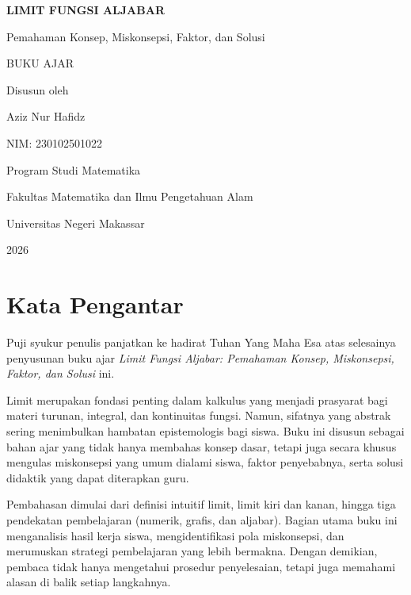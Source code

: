 \documentclass[12pt,a4paper,openany]{book}
\theoremstyle{definition}
\begin{document}
\begin{titlepage}
\centering
\vspace*{3cm}
{\Huge\bfseries LIMIT FUNGSI ALJABAR\par}
\vspace{0.5cm}
{\Large Pemahaman Konsep, Miskonsepsi, Faktor, dan Solusi\par}
\vspace{2cm}
{\Large BUKU AJAR\par}
\vspace{3cm}
{\large Disusun oleh\par}
\vspace{0.3cm}
{\large Aziz Nur Hafidz\par}
{\large NIM: 230102501022\par}
\vfill
{\large Program Studi Matematika\par}
{\large Fakultas Matematika dan Ilmu Pengetahuan Alam\par}
{\large Universitas Negeri Makassar\par}
{\large 2026\par}
\end{titlepage}

\frontmatter
\chapter*{Kata Pengantar}

Puji syukur penulis panjatkan ke hadirat Tuhan Yang Maha Esa atas selesainya penyusunan buku ajar \textit{Limit Fungsi Aljabar: Pemahaman Konsep, Miskonsepsi, Faktor, dan Solusi} ini.

Limit merupakan fondasi penting dalam kalkulus yang menjadi prasyarat bagi materi turunan, integral, dan kontinuitas fungsi. Namun, sifatnya yang abstrak sering menimbulkan hambatan epistemologis bagi siswa. Buku ini disusun sebagai bahan ajar yang tidak hanya membahas konsep dasar, tetapi juga secara khusus mengulas miskonsepsi yang umum dialami siswa, faktor penyebabnya, serta solusi didaktik yang dapat diterapkan guru.

Pembahasan dimulai dari definisi intuitif limit, limit kiri dan kanan, hingga tiga pendekatan pembelajaran (numerik, grafis, dan aljabar). Bagian utama buku ini menganalisis hasil kerja siswa, mengidentifikasi pola miskonsepsi, dan merumuskan strategi pembelajaran yang lebih bermakna. Dengan demikian, pembaca tidak hanya mengetahui prosedur penyelesaian, tetapi juga memahami alasan di balik setiap langkahnya.
\end{document}
